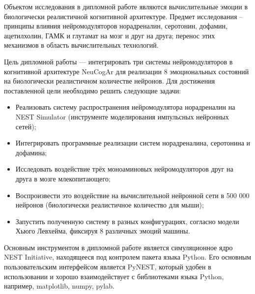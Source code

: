 Объектом исследования в дипломной работе являются вычислительные эмоции в биологически реалистичной когнитивной архитектуре. Предмет исследования – принципы влияния нейромодуляторов норадреналин, серотонин, дофамин, ацетилхолин, ГАМК и глутамат на мозг и друг на друга; перенос этих механизмов в область вычислительных технологий.

Цель дипломной работы — интегрировать три системы нейромодуляторов в когнитивной архитектуре NeuCogAr для реализации 8 эмоциональных состояний на биологически реалистичном количестве нейронов. Для достижения поставленной цели необходимо решить следующие задачи:
\begin{itemize}
\item Реализовать систему распространения нейромодулятора норадреналин на NEST Simulator (инструменте моделирования импульсных нейронных сетей);
\item Интегрировать программные реализации систем норадреналина, серотонина и дофамина;
\item Исследовать воздействие трёх моноаминовых нейромодуляторов друг на друга в мозге млекопитающего;
\item Воспроизвести это воздействие на вычислительной нейронной сети в 500 000 нейронов (биологически реалистичное количество для мыши);
\item Запустить полученную систему в разных конфигурациях, согласно модели Хьюго Левхейма, фиксируя 8 различных эмоций машины.
\end{itemize}

Основным инструментом в дипломной работе является симуляционное ядро NEST Initiative, находящееся под контролем пакета языка Python. Его основным пользовательским интерфейсом является PyNEST, который удобен в использовании и хорошо взаимодействует с библиотеками языка Python, например, matplotlib, numpy, pylab.